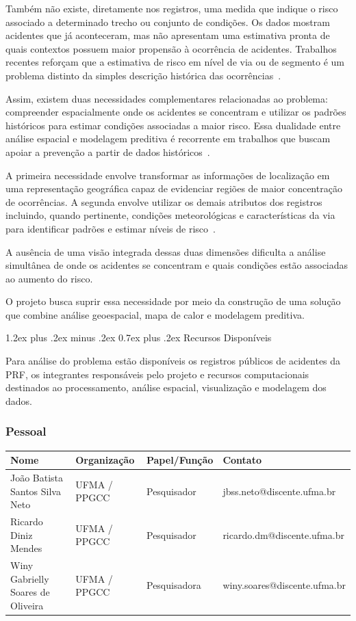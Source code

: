 \documentclass[11pt,a4paper]{article}
\makeatletter
\newcommand{\IntegranteTres}{Winy Gabrielly Soares de Oliveira}
\newcommand{\IntegranteDois}{Ricardo Diniz Mendes}
\newcommand{\IntegranteUm}{João Batista Santos Silva Neto}
\newcommand{\EmailTres}{winy.soares@discente.ufma.br}
\newcommand{\EmailDois}{ricardo.dm@discente.ufma.br}
\newcommand{\EmailUm}{jbss.neto@discente.ufma.br}
\renewcommand\subsection{
\@startsection{subsection}{2}{0pt}%
{1.2ex plus .2ex minus .2ex}%
{0.7ex plus .2ex}%
{\normalfont\large\bfseries}
}
\makeatother
\begin{document}
Também não existe, diretamente nos registros, uma medida que indique o risco associado a determinado trecho ou conjunto de condições. Os dados mostram acidentes que já aconteceram, mas não apresentam uma estimativa pronta de quais contextos possuem maior propensão à ocorrência de acidentes. Trabalhos recentes reforçam que a estimativa de risco em nível de via ou de segmento é um problema distinto da simples descrição histórica das ocorrências~\cite{gao2024,iranmanesh2022}.

Assim, existem duas necessidades complementares relacionadas ao problema: compreender espacialmente onde os acidentes se concentram e utilizar os padrões históricos para estimar condições associadas a maior risco. Essa dualidade entre análise espacial e modelagem preditiva é recorrente em trabalhos que buscam apoiar a prevenção a partir de dados históricos~\cite{santos2021,affou2026,tozetto2025}.

A primeira necessidade envolve transformar as informações de localização em uma representação geográfica capaz de evidenciar regiões de maior concentração de ocorrências. A segunda envolve utilizar os demais atributos dos registros incluindo, quando pertinente, condições meteorológicas e características da via para identificar padrões e estimar níveis de risco~\cite{he2025,jeyabharathi2026}.

A ausência de uma visão integrada dessas duas dimensões dificulta a análise simultânea de onde os acidentes se concentram e quais condições estão associadas ao aumento do risco.

O projeto busca suprir essa necessidade por meio da construção de uma solução que combine análise geoespacial, mapa de calor e modelagem preditiva.


\subsection{Recursos Disponíveis}

Para análise do problema estão disponíveis os registros públicos de acidentes da PRF, os integrantes responsáveis pelo projeto e recursos computacionais destinados ao processamento, análise espacial, visualização e modelagem dos dados.

\subsubsection*{Pessoal}

\begin{center}
\renewcommand{\arraystretch}{1.3}
\begin{tabularx}{\textwidth}{|X|p{2.5cm}|p{2.6cm}|p{5.7cm}|}
\hline
\textbf{Nome} & \textbf{Organização} & \textbf{Papel/Função} & \textbf{Contato} \\
\hline
\IntegranteUm & UFMA / PPGCC & Pesquisador & \EmailUm \\
\hline
\IntegranteDois & UFMA / PPGCC & Pesquisador & \EmailDois \\
\hline
\IntegranteTres & UFMA / PPGCC & Pesquisadora & \EmailTres \\
\hline
\end{tabularx}
\end{center}
\end{document}

